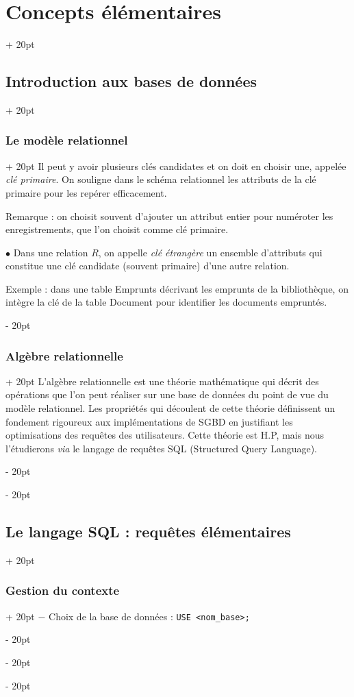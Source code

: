 \documentclass[a4paper, 12pt, twoside]{article}
\newcommand{\ind}[1][20pt]{\advance\leftskip + #1}
\newcommand{\deind}[1][20pt]{\advance\leftskip - #1}
\newenvironment{indt}[2][20pt]{#2 \par \ind[#1]}{\par \deind} %
\begin{document}
\begin{indt}{\section{Concepts élémentaires}}
\begin{indt}{\subsection{Introduction aux bases de données}}
\begin{indt}{\subsubsection{Le modèle relationnel}}
                Il peut y avoir plusieurs clés candidates et on doit en choisir une, appelée \textit{clé primaire}. On souligne dans le schéma relationnel les attributs de la clé primaire pour les repérer efficacement.
                
                Remarque : on choisit souvent d'ajouter un attribut entier pour numéroter les enregistrements, que l'on choisit comme clé primaire.
                
                \vspace{12pt}
                
                $\bullet$ Dans une relation $R$, on appelle \textit{clé étrangère} un ensemble d'attributs qui constitue une clé candidate (souvent primaire) d'une autre relation.
                
                \vspace{6pt}
                
                Exemple : dans une table Emprunts décrivant les emprunts de la bibliothèque, on intègre la clé de la table Document pour identifier les documents empruntés.
            \end{indt}
            
            \vspace{12pt}
            
            \begin{indt}{\subsubsection{Algèbre relationnelle}}
                L'algèbre relationnelle est une théorie mathématique qui décrit des opérations que l'on peut réaliser sur une base de données du point de vue du modèle relationnel. Les propriétés qui découlent de cette théorie définissent un fondement rigoureux aux implémentations de SGBD en justifiant les optimisations des requêtes des utilisateurs. Cette théorie est H.P, mais nous l'étudierons \textit{via} le langage de requêtes SQL (Structured Query Language).
            \end{indt}
        \end{indt}
        
        \begin{indt}{\subsection{Le langage SQL : requêtes élémentaires}}
            \begin{indt}{\subsubsection{Gestion du contexte}}
                $-$ Choix de la base de données : \texttt{USE <nom\_base>;}
                

\end{indt}
\end{indt}
\end{indt}
\end{document}
